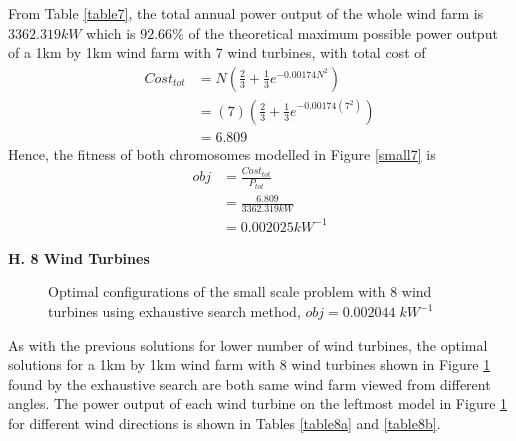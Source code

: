         From Table \ref{table7}, the total annual power output of the whole wind farm is $3362.319kW$ which is $92.66\%$ of the theoretical maximum possible power output of a 1km by 1km wind farm with 7 wind turbines, with total cost of
        \begin{align*}
            Cost_{tot}
            &= N\left(\frac{2}{3} + \frac{1}{3}e^{-0.00174N^2}\right) \\
            &= \left(7\right)\left(\frac{2}{3} + \frac{1}{3}e^{-0.00174\left(7^2\right)}\right) \\
            &= 6.809
        \end{align*}
        Hence, the fitness of both chromosomes modelled in Figure \ref{small7} is
        \begin{align*}
            obj
            &=\frac{Cost_{tot}}{P_{tot}} \\
            &=\frac{6.809}{3362.319kW} \\
            &=0.002025kW^{-1}
        \end{align*} 
        
    \textbf{H. 8 Wind Turbines}
        \begin{figure}[H]
            \centering
            \qquad
            \caption{Optimal configurations of the small scale problem with 8 wind turbines using exhaustive search method, $obj=0.002044\;kW^{-1}$}
            \label{small8}
        \end{figure}
        
        As with the previous solutions for lower number of wind turbines, the optimal solutions for a 1km by 1km wind farm with 8 wind turbines shown in Figure \ref{small8} found by the exhaustive search are both same wind farm viewed from different angles. The power output of each wind turbine on the leftmost model in Figure \ref{small8} for different wind directions is shown in Tables \ref{table8a} and \ref{table8b}.
        
